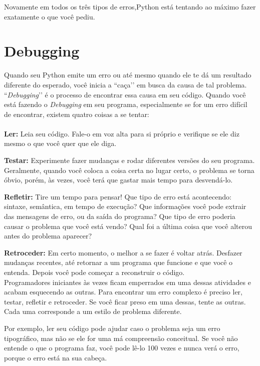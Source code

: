 Novamente em todos os três tipos de erros,Python está tentando ao máximo fazer exatamente o que você pediu.

\section{Debugging} %

Quando seu Python emite um erro ou até mesmo quando ele te dá um resultado diferente do esperado, você inicia a ``caça’’ em busca da causa de tal problema. ``{\it Debugging}’’ é o processo de encontrar essa causa em seu código. Quando você está fazendo o {\it Debugging} em seu programa, especialmente se for um erro difícil de encontrar, existem quatro coisas a se tentar: \\
 \\
{\bf  Ler:} Leia seu código. Fale-o em voz alta para si próprio e verifique se ele diz mesmo o que você quer que ele diga.

{\bf  Testar:} Experimente fazer mudanças e rodar diferentes versões do seu programa. Geralmente, quando você coloca a coisa certa no lugar certo, o problema se torna óbvio, porém, às vezes, você terá que gastar mais tempo para desvendá-lo.

{\bf  Refletir:} Tire um tempo para pensar! Que tipo de erro está acontecendo: sintaxe, semântica, em tempo de execução? Que informações você pode extrair das mensagens de erro, ou da saída do programa? Que tipo de erro poderia causar o problema que você está vendo? Qual foi a última coisa que você alterou antes do problema aparecer?

{\bf Retroceder:} Em certo momento, o melhor a se fazer é voltar atrás. Desfazer mudanças recentes, até retornar a um programa que funcione e que você o entenda. Depois você pode começar a reconstruir o código.\\

Programadores iniciantes às vezes ficam emperrados em uma dessas atividades e acabam esquecendo as outras. Para encontrar um erro complexo é preciso ler, testar, refletir e retroceder. Se você ficar preso em uma dessas, tente as outras. Cada uma corresponde a um estilo de problema diferente.

Por exemplo, ler seu código pode ajudar caso o problema seja um erro tipográfico, mas não se ele for uma má compreensão conceitual. Se você não entende o que o programa faz, você pode lê-lo 100 vezes e nunca verá o erro, porque o erro está na sua cabeça.

